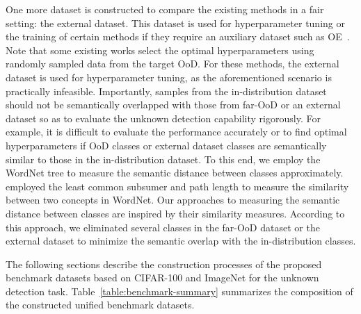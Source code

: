\documentclass[preprint,12pt]{elsarticle}
\begin{document}
One more dataset is constructed to compare the existing methods in a fair setting: the external dataset. This dataset is used for hyperparameter tuning or the training of certain methods if they require an auxiliary dataset such as OE~\citep{hendrycks2018deep}. Note that some existing works select the optimal hyperparameters using randomly sampled data from the target OoD. For these methods, the external dataset is used for hyperparameter tuning, as the aforementioned scenario is practically infeasible. Importantly, samples from the in-distribution dataset should not be semantically overlapped with those from far-OoD or an external dataset so as to evaluate the unknown detection capability rigorously. For example, it is difficult to evaluate the performance accurately or to find optimal hyperparameters if OoD classes or external dataset classes are semantically similar to those in the in-distribution dataset. To this end, we employ the WordNet tree to measure the semantic distance between classes approximately. \cite{pedersen2004wordnet} employed the least common subsumer and path length to measure the similarity between two concepts in WordNet. Our approaches to measuring the semantic distance between classes are inspired by their similarity measures. According to this approach, we eliminated several classes in the far-OoD dataset or the external dataset to minimize the semantic overlap with the in-distribution classes.

The following sections describe the construction processes of the proposed benchmark datasets based on CIFAR-100 and ImageNet for the unknown detection task. Table~\ref{table:benchmark-summary} summarizes the composition of the constructed unified benchmark datasets.
\end{document}
